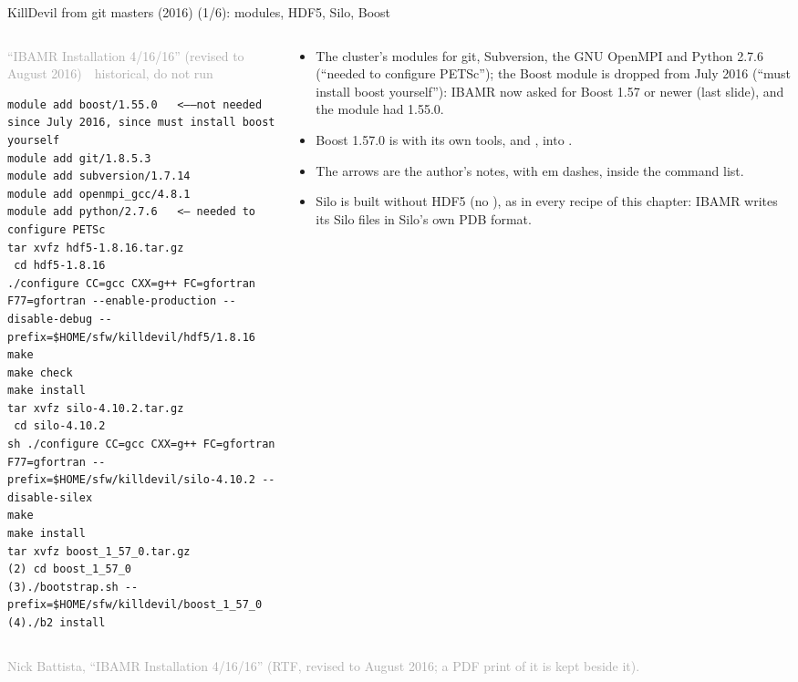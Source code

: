 \documentclass[aspectratio=169,11pt]{beamer}
\newcommand{\sourcecredit}[1]{\vfill\begin{flushright}\tiny\textcolor{DarkGray}{#1}\end{flushright}}
\newcommand{\emdashmark}{\textcolor{RubineRed}{\rmfamily\textemdash}}
\newcommand{\hist}[1]{{\tiny\sffamily\textcolor{DarkGray}{#1\ \textbullet\ historical, do not run}}\par\nointerlineskip\vspace{0.3mm}}
\begin{document}
\begin{frame}[fragile]{KillDevil from git masters (2016) (1/6): modules, HDF5, Silo, Boost}
\label{fr:nb1}
\begin{columns}[T,onlytextwidth]
\begin{column}{0.53\textwidth}
\hist{``IBAMR Installation 4/16/16'' (revised to August 2016)}
\begin{lstlisting}[style=hist]
module add boost/1.55.0   <——not needed since July 2016, since must install boost yourself
module add git/1.8.5.3
module add subversion/1.7.14
module add openmpi_gcc/4.8.1
module add python/2.7.6   <— needed to configure PETSc
tar xvfz hdf5-1.8.16.tar.gz
 cd hdf5-1.8.16
./configure CC=gcc CXX=g++ FC=gfortran F77=gfortran --enable-production --disable-debug --prefix=$HOME/sfw/killdevil/hdf5/1.8.16
make
make check
make install
tar xvfz silo-4.10.2.tar.gz
 cd silo-4.10.2
sh ./configure CC=gcc CXX=g++ FC=gfortran F77=gfortran --prefix=$HOME/sfw/killdevil/silo-4.10.2 --disable-silex
make
make install
tar xvfz boost_1_57_0.tar.gz
(2) cd boost_1_57_0
(3)./bootstrap.sh --prefix=$HOME/sfw/killdevil/boost_1_57_0
(4)./b2 install
\end{lstlisting}
\end{column}
\begin{column}{0.44\textwidth}
\scriptsize
\begin{itemize}\setlength{\itemsep}{2pt}
  \item The cluster's modules for git, Subversion, the GNU OpenMPI and Python 2.7.6 (``needed to configure PETSc''); the Boost module is dropped from July 2016 (``must install boost yourself''): IBAMR now asked for Boost 1.57 or newer (last slide), and the module had 1.55.0.
  \item Boost 1.57.0 is  with its own tools,  and , into .
  \item The \code{<\emdashmark{}} arrows are the author's notes, with em dashes, inside the command list.
  \item Silo is built without HDF5 (no ), as in every recipe of this chapter: IBAMR writes its Silo files in Silo's own PDB format.
\end{itemize}
\end{column}
\end{columns}
\sourcecredit{Nick Battista, ``IBAMR Installation 4/16/16'' (RTF, revised to August 2016; a PDF print of it is kept beside it).}
\end{frame}
\end{document}
